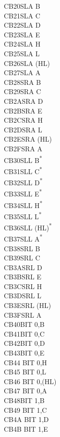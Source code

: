\documentclass[twoside,openright,a4paper]{book}
\begin{document}
\begin{multicols}{3}
{\begin{tabbing}
	CB20\>SLA B\\
	CB21\>SLA C\\
	CB22\>SLA D\\
	CB23\>SLA E\\
	CB24\>SLA H\\
	CB25\>SLA L\\
	CB26\>SLA (HL)\\
	CB27\>SLA A\\
	CB28\>SRA B\\
	CB29\>SRA C\\
	CB2A\>SRA D\\
	CB2B\>SRA E\\
	CB2C\>SRA H\\
	CB2D\>SRA L\\
	CB2E\>SRA (HL)\\
	CB2F\>SRA A\\
	CB30\>SLL B\textsuperscript{*}\\
	CB31\>SLL C\textsuperscript{*}\\
	CB32\>SLL D\textsuperscript{*}\\
	CB33\>SLL E\textsuperscript{*}\\
	CB34\>SLL H\textsuperscript{*}\\
	CB35\>SLL L\textsuperscript{*}\\
	CB36\>SLL (HL)\textsuperscript{*}\\
	CB37\>SLL A\textsuperscript{*}\\
	CB38\>SRL B\\
	CB39\>SRL C\\
	CB3A\>SRL D\\
	CB3B\>SRL E\\
	CB3C\>SRL H\\
	CB3D\>SRL L\\
	CB3E\>SRL (HL)\\
	CB3F\>SRL A\\
	CB40\>BIT 0,B\\
	CB41\>BIT 0,C\\
	CB42\>BIT 0,D\\
	CB43\>BIT 0,E\\
	CB44\> 	BIT 0,H\\
	CB45\> 	BIT 0,L\\
	CB46\> 	BIT 0,(HL)\\
	CB47\> 	BIT 0,A\\
	CB48\>BIT 1,B\\
	CB49\> 	BIT 1,C\\
	CB4A\> 	BIT 1,D\\
	CB4B\> 	BIT 1,E\\

\end{tabbing}}
\end{multicols}
\end{document}
